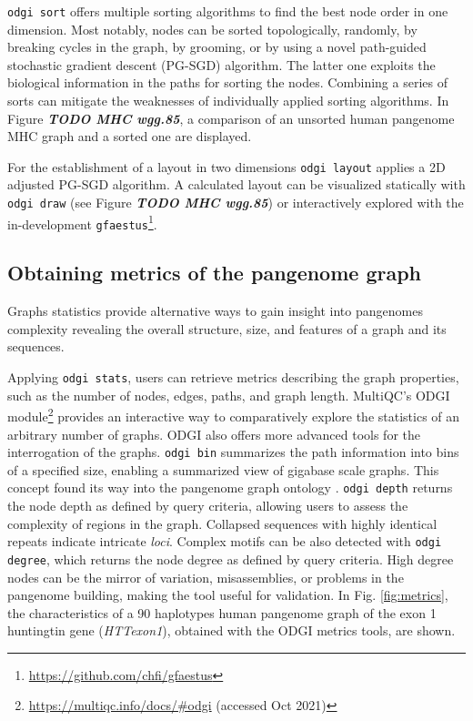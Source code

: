 \documentclass{bioinfo}
\begin{document}
\texttt{odgi sort} offers multiple sorting algorithms to find the best node order in one dimension. Most notably, nodes can be sorted topologically, randomly, by breaking cycles in the graph, by grooming, or by using a novel path-guided stochastic gradient descent (PG-SGD) algorithm. 
The latter one exploits the biological information in the paths for sorting the nodes.
Combining a series of sorts can mitigate the weaknesses of individually applied sorting algorithms. 
In Figure \textbf{\textit{TODO MHC wgg.85}}, a comparison of an unsorted human pangenome MHC graph and a sorted one are displayed.

For the establishment of a layout in two dimensions \texttt{odgi layout} applies a 2D adjusted PG-SGD algorithm. A calculated layout can be visualized statically with \texttt{odgi draw} (see Figure \textit{\textbf{TODO MHC wgg.85}}) or interactively explored with the in-development \texttt{gfaestus}\footnote{\url{https://github.com/chfi/gfaestus}}.

\subsection{Obtaining metrics of the pangenome graph}





Graphs statistics provide alternative ways to gain insight into pangenomes complexity revealing the overall structure, size, and features of a graph and its sequences. 

Applying \texttt{odgi stats}, users can retrieve metrics describing the graph properties, such as the number of nodes, edges, paths, and graph length. 
MultiQC's \citep{Ewels_2016} ODGI module\footnote{\url{https://multiqc.info/docs/\#odgi} (accessed Oct 2021)} provides an interactive way to comparatively explore the statistics of an arbitrary number of graphs. 
ODGI also offers more advanced tools for the interrogation of the graphs. \texttt{odgi bin} summarizes the path information into bins of a specified size, enabling a summarized view of gigabase scale graphs. 
This concept found its way into the pangenome graph ontology \cite{Yokoyama2020}. \texttt{odgi depth} returns the node depth as defined by query criteria, allowing users to assess the complexity of regions in the graph. 
Collapsed sequences with highly identical repeats indicate intricate \textit{loci}. 
Complex motifs can be also detected with \texttt{odgi degree}, which returns the node degree as defined by query criteria. 
High degree nodes can be the mirror of variation, misassemblies, or problems in the pangenome building, making the tool useful for validation. 
In Fig. \ref{fig:metrics}, the characteristics of a 90 haplotypes human pangenome graph of the exon 1 huntingtin gene \citep{Sathasivam2013,Neueder2017} (\textit{HTTexon1}), obtained with the ODGI metrics tools, are shown.
\end{document}
